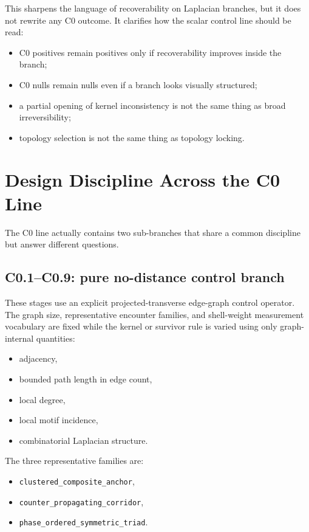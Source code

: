 \documentclass[11pt]{article}
\begin{document}
This sharpens the language of recoverability on Laplacian branches, but it does not rewrite any C0 outcome. It clarifies how the scalar control line should be read:
\begin{itemize}
\item C0 positives remain positives only if recoverability improves inside the branch;
\item C0 nulls remain nulls even if a branch looks visually structured;
\item a partial opening of kernel inconsistency is not the same thing as broad irreversibility;
\item topology selection is not the same thing as topology locking.
\end{itemize}

\section{Design Discipline Across the C0 Line}

The C0 line actually contains two sub-branches that share a common discipline but answer different questions.

\subsection{C0.1--C0.9: pure no-distance control branch}

These stages use an explicit projected-transverse edge-graph control operator. The graph size, representative encounter families, and shell-weight measurement vocabulary are fixed while the kernel or survivor rule is varied using only graph-internal quantities:
\begin{itemize}
\item adjacency,
\item bounded path length in edge count,
\item local degree,
\item local motif incidence,
\item combinatorial Laplacian structure.
\end{itemize}

The three representative families are:
\begin{itemize}
\item \texttt{clustered\_composite\_anchor},
\item \texttt{counter\_propagating\_corridor},
\item \texttt{phase\_ordered\_symmetric\_triad}.
\end{itemize}
\end{document}
